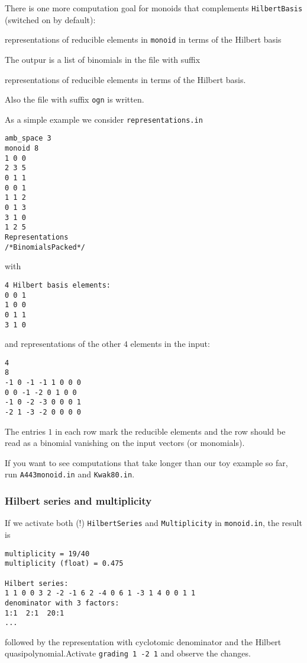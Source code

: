 There is one more computation goal for monoids that complements \verb|HilbertBasis| (switched on by default):
\begin{itemize}
	\itemtt[Representations] representations of reducible elements in \verb|monoid| in terms of the Hilbert basis
\end{itemize}
The outpur is a list of binomials in the file with suffix
\begin{itemize}
	\itemtt[rep] representations  of reducible elements in terms of the Hilbert basis.
\end{itemize}
Also the file with suffix \verb|ogn| is written.

As a simple example we consider \verb|representations.in|
\begin{Verbatim}
amb_space 3
monoid 8
1 0 0
2 3 5
0 1 1
0 0 1
1 1 2
0 1 3
3 1 0
1 2 5
Representations
/*BinomialsPacked*/
\end{Verbatim}
with
\begin{Verbatim}
4 Hilbert basis elements:
0 0 1
1 0 0
0 1 1
3 1 0
\end{Verbatim}
and representations of the other $4$ elements in the input:
\begin{Verbatim}
4
8
-1 0 -1 -1 1 0 0 0 
0 0 -1 -2 0 1 0 0 
-1 0 -2 -3 0 0 0 1 
-2 1 -3 -2 0 0 0 0
\end{Verbatim}
The entries $1$ in each row mark the reducible elements and the row should be read as a binomial vanishing on the input vectors (or monomials).

If you want to see computations that take longer than our toy example so far, run \verb|A443monoid.in| and \verb|Kwak80.in|.


\subsubsection{Hilbert series and multiplicity}

If we activate both (!) \verb|HilbertSeries| and \verb|Multiplicity| in \verb|monoid.in|, the result is
\begin{Verbatim}
multiplicity = 19/40
multiplicity (float) = 0.475

Hilbert series:
1 1 0 0 3 2 -2 -1 6 2 -4 0 6 1 -3 1 4 0 0 1 1 
denominator with 3 factors:
1:1  2:1  20:1 
... 
\end{Verbatim}
followed by the representation with cyclotomic denominator and the Hilbert quasipolynomial.Activate \verb|grading 1 -2 1| and observe the changes.



